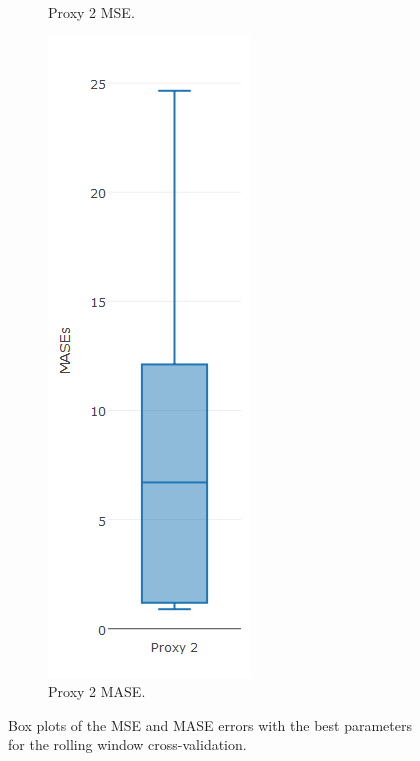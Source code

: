 \begin{figure}[!h]
{\begin{subfigure}{.25\linewidth}
  \caption{Proxy 2 MSE.}
  \label{fig:bp2.3a}
\end{subfigure}
\begin{subfigure}{.25\linewidth}
  \centering
  \includegraphics[width=\linewidth]{img/10ymaMasebpKnn.png}
  \caption{Proxy 2 MASE.}
  \label{fig:bp2.4a}
\end{subfigure}}
\caption{Box plots of the MSE and MASE errors with the best parameters for the rolling window cross-validation.}
\end{figure}